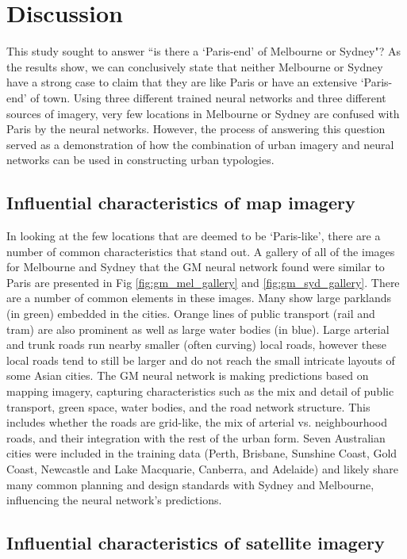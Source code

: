 \documentclass[10pt,letterpaper,hidelinks]{article}
\begin{document}
\section*{Discussion}\label{sec:discussion}
This study sought to answer ``is there a `Paris-end' of Melbourne or Sydney"? As the results show, we can conclusively state that neither Melbourne or Sydney have a strong case to claim that they are like Paris or have an extensive `Paris-end' of town. Using three different trained neural networks and three different sources of imagery, very few locations in Melbourne or Sydney are confused with Paris by the neural networks. However, the process of answering this question served as a demonstration of how the combination of urban imagery and neural networks can be used in constructing urban typologies.

\subsection*{Influential characteristics of map imagery}

In looking at the few locations that are deemed to be `Paris-like', there are a number of common characteristics that stand out. A gallery of all of the images for Melbourne and Sydney that the GM neural network found were similar to Paris are presented in Fig \ref{fig:gm_mel_gallery} and \ref{fig:gm_syd_gallery}. There are a number of common elements in these images. Many show large parklands (in green) embedded in the cities. Orange lines of public transport (rail and tram) are also prominent as well as large water bodies (in blue). Large arterial and trunk roads run nearby smaller (often curving) local roads, however these local roads tend to still be larger and do not reach the small intricate layouts of some Asian cities. The GM neural network is making predictions based on mapping imagery, capturing characteristics such as the mix and detail of public transport, green space, water bodies, and the road network structure. This includes whether the roads are grid-like, the mix of arterial vs. neighbourhood roads, and their integration with the rest of the urban form. Seven Australian cities were included in the training data (Perth, Brisbane, Sunshine Coast, Gold Coast, Newcastle and Lake Macquarie, Canberra, and Adelaide) and likely share many common planning and design standards with Sydney and Melbourne, influencing the neural network's predictions. 

\subsection*{Influential characteristics of satellite imagery}
\end{document}
